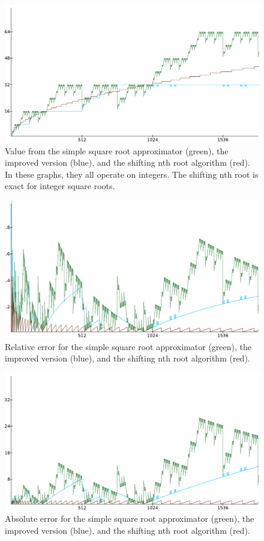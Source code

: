 		\begin{figure}[H]
			\centering
			\includegraphics[width=0.75\linewidth]{figure/value12x.png} 
			\caption{Value from the simple square root approximator (green),
				the improved version (blue), and the shifting nth root 
				algorithm (red). In these graphs, they all operate on integers. 
				The shifting nth root is exact for integer square roots.}
			\label{sres1}
		\end{figure}

		\begin{figure}[H]
			\centering
			\includegraphics[width=0.75\linewidth]{figure/rel_error_480x.png} 
			\caption{Relative error for the simple square root approximator
				(green), the improved version (blue), and the shifting nth root
				algorithm (red).}
			\label{sres2}
		\end{figure}

		\begin{figure}[H]
			\centering
			\includegraphics[width=0.75\linewidth]{figure/abs_error_24x.png} 
			\caption{Absolute error for the simple square root approximator
				(green), the improved version (blue), and the shifting nth root
				algorithm (red).}
			\label{sres3}
		\end{figure}

